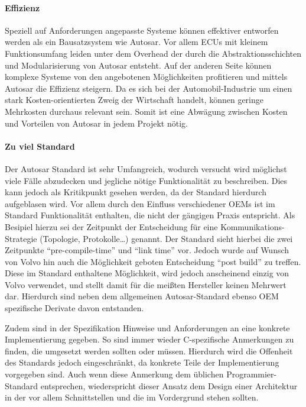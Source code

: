 \documentclass[
  a4paper,					    %
  twoside,
  DIV=calc,     				%
  bibliography=totoc,
  cleardoublepage=empty,
  ngerman,     					%
  final       					%
]{scrbook}
\begin{document}


\paragraph{Effizienz}
Speziell auf Anforderungen angepasste Systeme können effektiver entworfen werden als ein Bausatzsystem wie Autosar. Vor allem ECUs mit kleinem Funktionsumfang leiden unter dem Overhead der durch die Abstraktionsschichten und Modularisierung von Autosar entsteht. Auf der anderen Seite können komplexe Systeme von den angebotenen Möglichkeiten profitieren und mittels Autosar die Effizienz steigern.\cite{as_kritik}\cite{wiki:autosar} Da es sich bei der Automobil-Industrie um einen stark Kosten-orientierten Zweig der Wirtschaft handelt, können geringe Mehrkosten durchaus relevant sein. Somit ist eine Abwägung zwischen Kosten und Vorteilen von Autosar in jedem Projekt nötig.\cite[Seite 152]{SE_Autosar} 

\paragraph{Zu viel Standard}
Der Autosar Standard ist sehr Umfangreich, wodurch versucht wird möglichst viele Fälle abzudecken und jegliche nötige Funktionalität zu beschreiben. Dies kann jedoch als Kritikpunkt gesehen werden, da der Standard hierdurch aufgeblasen wird. Vor allem durch den Einfluss verschiedener OEMs ist im Standard Funktionalität enthalten, die nicht der gängigen Praxis entspricht. Als Besipiel hierzu sei der Zeitpunkt der Entscheidung für eine Kommunikations-Strategie (Topologie, Protokolle\dots) genannt.\cite{as_kritik} Der Standard sieht hierbei die zwei Zeitpunkte "`pre-compile-time"' und "`link time"' vor. Jedoch wurde auf Wunsch von Volvo hin auch die Möglichkeit geboten Entscheidung "`post build"' zu treffen. Diese im Standard enthaltene Möglichkeit, wird jedoch anscheinend einzig von Volvo verwendet, und stellt damit für die meißten Hersteller keinen Mehrwert dar. Hierdurch sind neben dem allgemeinen Autosar-Standard ebenso OEM spezifische Derivate davon entstanden.

Zudem sind in der Spezifikation Hinweise und Anforderungen an eine konkrete Implementierung gegeben. So sind immer wieder C-spezifische Anmerkungen zu finden, die umgesetzt werden sollten oder müssen. Hierdurch wird die Offenheit des Standards jedoch eingeschränkt, da konkrete Teile der Implementierung vorgegeben sind.\cite[Seite 20]{autosar_eth} Auch wenn diese Anmerkung dem üblichen Programmier-Standard entsprechen, wiederspricht dieser Ansatz dem Design einer Architektur in der vor allem Schnittstellen und die im Vordergrund stehen sollten. %
\end{document}
